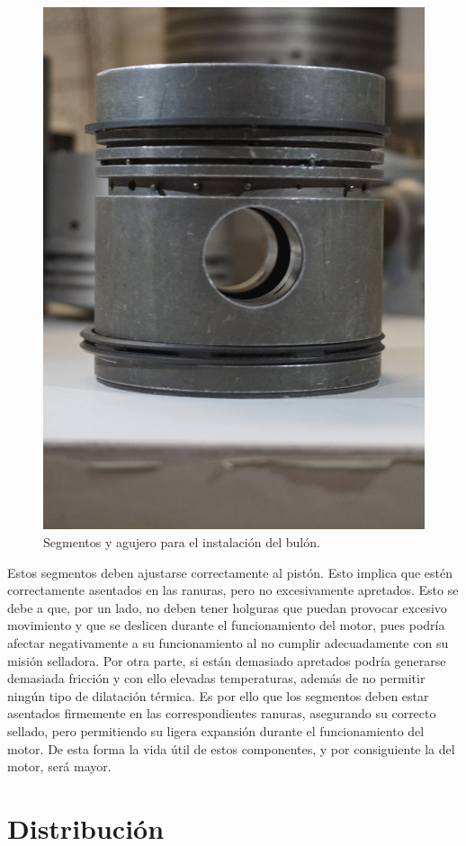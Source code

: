 \begin{figure}[H]
	\centering
	\includegraphics[width=0.5\linewidth]{Figures/01/m1/cil_side.jpg}
	\caption{Segmentos y agujero para el instalación del bulón.}
	\label{fig:emb_side}
\end{figure}

Estos segmentos deben ajustarse correctamente al pistón. Esto implica que estén correctamente asentados en las ranuras, pero no excesivamente apretados. Esto se debe a que, por un lado, no deben tener holguras que puedan provocar excesivo movimiento y que se deslicen durante el funcionamiento del motor, pues podría afectar negativamente a su funcionamiento al no cumplir adecuadamente con su misión selladora. Por otra parte, si están demasiado apretados podría generarse demasiada fricción y con ello elevadas temperaturas, además de no permitir ningún tipo de dilatación térmica. Es por ello que los segmentos deben estar asentados firmemente en las correspondientes ranuras, asegurando su correcto sellado, pero permitiendo su ligera expansión durante el funcionamiento del motor. De esta forma la vida útil de estos componentes, y por consiguiente la del motor, será mayor.

\newpage

\section{Distribución} \label{s:section_02}

